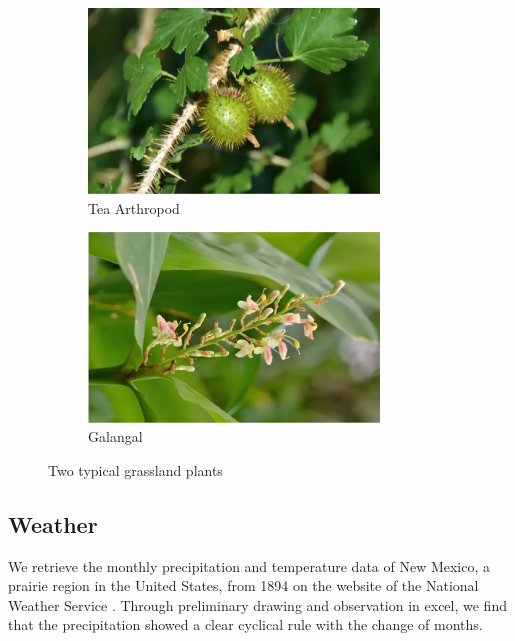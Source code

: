 \documentclass{mcmthesis}
\begin{document}
\begin{figure}[htbp]
\centering
\begin{subfigure}[t]{0.48\textwidth}
\centering
\includegraphics[width=0.85\textwidth]{./img/Tea Arthropod.png}
\caption{Tea Arthropod}
\end{subfigure}
\hfill
\begin{subfigure}[t]{0.48\textwidth}
\centering
\includegraphics[width=0.85\textwidth]{./img/Galangal.png}
\caption{Galangal}
\end{subfigure}
\caption{Two typical grassland plants \cite{1}}
\end{figure}

\subsection{Weather}

\indent

We retrieve the monthly precipitation and temperature data of New Mexico, a prairie region in the United States, from 1894 on the website of the National Weather Service \cite{2}. Through preliminary drawing and observation in excel, we find that the precipitation showed a clear cyclical rule with the change of months. 
\end{document}
